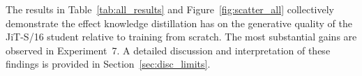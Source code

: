 The results in Table~\ref{tab:all_results} and Figure~\ref{fig:scatter_all}
collectively demonstrate the effect knowledge distillation has on the generative quality of the JiT-S/16 student
relative to training from scratch. The most substantial gains are observed
in Experiment~7. A detailed discussion and interpretation of these findings is provided in Section~\ref{sec:disc_limits}.








































































































